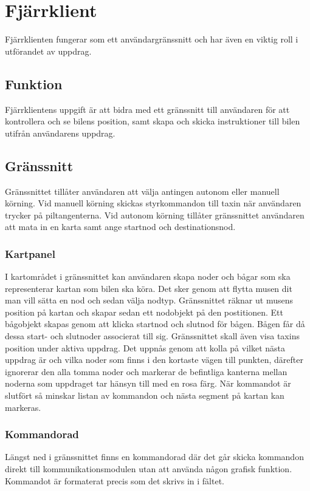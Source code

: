 \documentclass[tekniskrapport/tech.tex]{subfiles}
\begin{document}
\section{Fjärrklient}
Fjärrklienten fungerar som ett användargränssnitt och har även en
viktig roll i utförandet av uppdrag.

\subsection{Funktion}
Fjärrklientens uppgift är att bidra med ett gränssnitt till användaren för att
kontrollera och se bilens position, samt skapa och skicka instruktioner till
bilen utifrån användarens uppdrag.

\subsection{Gränssnitt}
Gränssnittet tillåter användaren att välja antingen autonom eller manuell
körning. Vid manuell körning skickas styrkommandon till taxin när användaren
trycker på piltangenterna. Vid autonom körning tillåter gränssnittet användaren
att mata in en karta samt ange startnod och destinationsnod. 

\subsubsection{Kartpanel}
I kartområdet i gränssnittet kan användaren skapa noder och bågar som ska
representerar kartan som bilen ska köra. Det sker genom att flytta musen dit
man vill sätta en nod och sedan välja nodtyp. Gränssnittet räknar ut musens
position på kartan och skapar sedan ett nodobjekt på den postitionen.  Ett
bågobjekt skapas genom att klicka startnod och slutnod för bågen.  Bågen får då
dessa start- och slutnoder associerat till sig.  Gränssnittet skall även visa
taxins position under aktiva uppdrag. Det uppnås genom att kolla på vilket
nästa uppdrag är och vilka noder som finns i den kortaste vägen till punkten,
därefter ignorerar den alla tomma noder och markerar de befintliga kanterna
mellan noderna som uppdraget tar hänsyn till  med en rosa färg. När kommandot
är slutfört så minskar listan av kommandon och nästa segment på kartan kan
markeras.

\subsubsection{Kommandorad}
Längst ned i gränssnittet finns en kommandorad där det går skicka kommandon
direkt till kommunikationsmodulen utan att använda någon grafisk funktion.
Kommandot är formaterat precis som det skrivs in i fältet.
\end{document}
